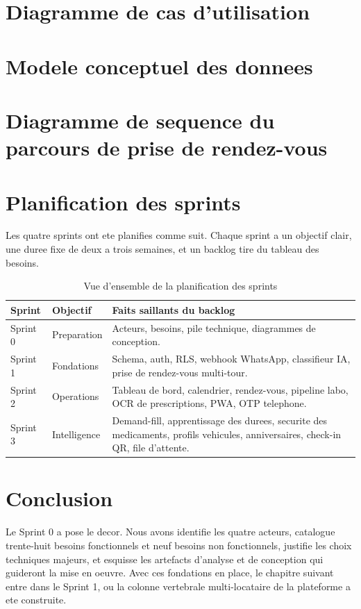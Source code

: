 \section{Diagramme de cas d'utilisation}


\section{Modele conceptuel des donnees}


\section{Diagramme de sequence du parcours de prise de rendez-vous}


\section{Planification des sprints}
Les quatre sprints ont ete planifies comme suit. Chaque sprint a un objectif
clair, une duree fixe de deux a trois semaines, et un backlog tire du
tableau des besoins.

\begin{table}[H]
  \centering\footnotesize
  \begin{tabular}{p{1.6cm}p{2.6cm}p{9cm}}
    \toprule
    \textbf{Sprint} & \textbf{Objectif} & \textbf{Faits saillants du backlog} \\
    \midrule
    Sprint 0 & Preparation & Acteurs, besoins, pile technique, diagrammes de conception. \\
    Sprint 1 & Fondations & Schema, auth, RLS, webhook WhatsApp, classifieur IA, prise de rendez-vous multi-tour. \\
    Sprint 2 & Operations & Tableau de bord, calendrier, rendez-vous, pipeline labo, OCR de prescriptions, PWA, OTP telephone. \\
    Sprint 3 & Intelligence & Demand-fill, apprentissage des durees, securite des medicaments, profils vehicules, anniversaires, check-in QR, file d'attente. \\
    \bottomrule
  \end{tabular}
  \caption{Vue d'ensemble de la planification des sprints}
  \label{tab:plan}
\end{table}

\section{Conclusion}
Le Sprint 0 a pose le decor. Nous avons identifie les quatre acteurs,
catalogue trente-huit besoins fonctionnels et neuf besoins non
fonctionnels, justifie les choix techniques majeurs, et esquisse les
artefacts d'analyse et de conception qui guideront la mise en oeuvre.
Avec ces fondations en place, le chapitre suivant entre dans le Sprint 1,
ou la colonne vertebrale multi-locataire de la plateforme a ete construite.
